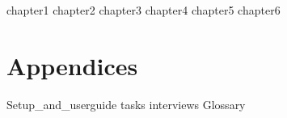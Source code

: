 \documentclass[12pt,a4paper]{report}
\begin{document}
\tableofcontents

{chapter1}
{chapter2}
{chapter3}
{chapter4}
{chapter5}
{chapter6}


\appendix
\chapter{Appendices}
{Setup_and_userguide}
{tasks}
{interviews}
{Glossary}
\end{document}
